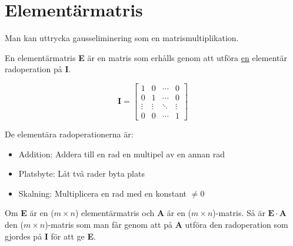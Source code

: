 \section{Elementärmatris} %
\label{sec:element_rmatris}
Man kan uttrycka gausseliminering som en matrismultiplikation.
\begin{Def}
    En elementärmatris \textbf{E} är en matris som erhålls genom att utföra \underline{en} elementär radoperation på \textbf{I}.
\end{Def}
\begin{Rem}
    \[
        \mathbf{I} = \begin{bmatrix}
        1 & 0 & \cdots & 0\\
        0 & 1 & \cdots & 0\\
        \vdots & \vdots & \ddots & \vdots\\
        0 & 0 & \cdots & 1
         \end{bmatrix}
    \]
\end{Rem}
\noindent
De elementära radoperationerna är:
\begin{itemize}
	\item Addition: Addera till en rad en multipel av en annan rad
	\item Platsbyte: Låt två rader byta plats
	\item Skalning: Multiplicera en rad med en konstant $\neq 0$
\end{itemize}
Om \textbf{E} är en ($m \times n$) elementärmatris och \textbf{A} är en ($m \times n$)-matris. Så är $\mathbf{E} \cdot \mathbf{A}$ den ($m \times n$)-matris som man får genom att på \textbf{A} utföra den radoperation som gjordes på \textbf{I} för att ge \textbf{E}.
